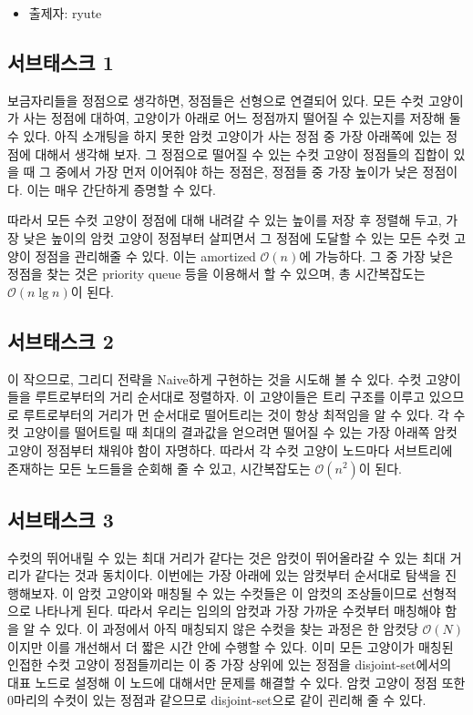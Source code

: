 \documentclass{article}
\begin{document}
	\begin{itemize}
		\item 출제자: ryute
	\end{itemize}
	
	\subsection{서브태스크 1}
	보금자리들을 정점으로 생각하면, 정점들은 선형으로 연결되어 있다. 모든 수컷 고양이가 사는 정점에 대하여, 고양이가 아래로 어느 정점까지 떨어질 수 있는지를 저장해 둘 수 있다. 아직 소개팅을 하지 못한 암컷 고양이가 사는 정점 중 가장 아래쪽에 있는 정점에 대해서 생각해 보자. 그 정점으로 떨어질 수 있는 수컷 고양이 정점들의 집합이 있을 때 그 중에서 가장 먼저 이어줘야 하는 정점은, 정점들 중 가장 높이가 낮은 정점이다. 이는 매우 간단하게 증명할 수 있다.\newline
	
	따라서 모든 수컷 고양이 정점에 대해 내려갈 수 있는 높이를 저장 후 정렬해 두고, 가장 낮은 높이의 암컷 고양이 정점부터 살피면서 그 정점에 도달할 수 있는 모든 수컷 고양이 정점을 관리해줄 수 있다. 이는 amortized $\mathcal{O}(n)$에 가능하다. 그 중 가장 낮은 정점을 찾는 것은 priority queue 등을 이용해서 할 수 있으며, 총 시간복잡도는 $\mathcal{O}(n \lg n)$이 된다.
	
	\subsection{서브태스크 2}
	이 작으므로, 그리디 전략을 Naive하게 구현하는 것을 시도해 볼 수 있다. 수컷 고양이들을 루트로부터의 거리 순서대로 정렬하자. 이 고양이들은 트리 구조를 이루고 있으므로 루트로부터의 거리가 먼 순서대로 떨어트리는 것이 항상 최적임을 알 수 있다. 각 수컷 고양이를 떨어트릴 때 최대의 결과값을 얻으려면 떨어질 수 있는 가장 아래쪽 암컷 고양이 정점부터 채워야 함이 자명하다. 따라서 각 수컷 고양이 노드마다 서브트리에 존재하는 모든 노드들을 순회해 줄 수 있고, 시간복잡도는 $\mathcal{O}(n^2)$이 된다.
	
	\subsection{서브태스크 3}
	수컷의 뛰어내릴 수 있는 최대 거리가 같다는 것은 암컷이 뛰어올라갈 수 있는 최대 거리가 같다는 것과 동치이다. 이번에는 가장 아래에 있는 암컷부터 순서대로 탐색을 진행해보자. 이 암컷 고양이와 매칭될 수 있는 수컷들은 이 암컷의 조상들이므로 선형적으로 나타나게 된다. 따라서 우리는 임의의 암컷과 가장 가까운 수컷부터 매칭해야 함을 알 수 있다. 이 과정에서 아직 매칭되지 않은 수컷을 찾는 과정은 한 암컷당 $\mathcal{O}(N)$이지만 이를 개선해서 더 짧은 시간 안에 수행할 수 있다. 이미 모든 고양이가 매칭된 인접한 수컷 고양이 정점들끼리는 이 중 가장 상위에 있는 정점을 disjoint-set에서의 대표 노드로 설정해 이 노드에 대해서만 문제를 해결할 수 있다. 암컷 고양이 정점 또한 0마리의 수컷이 있는 정점과 같으므로 disjoint-set으로 같이 괸리해 줄 수 있다.
	
\end{document}
